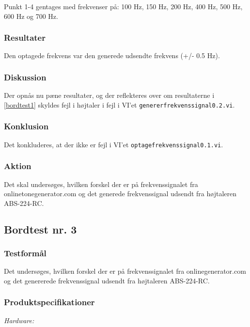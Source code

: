 			Punkt 1-4 gentages med frekvenser på: 100 Hz, 150 Hz, 200 Hz, 400 Hz, 500 Hz, 600 Hz og 700 Hz. 
			
			\subsubsection{Resultater}
			Den optagede frekvens var den generede udsendte frekvens (+/- 0.5 Hz). 
			\subsubsection{Diskussion}
			Der opnås nu pæne resultater, og der reflekteres over om resultaterne i \ref{bordtest1} skyldes fejl i højtaler i fejl i VI'et \texttt{genererfrekvenssignal0.2.vi}. 
			\subsubsection{Konklusion}
			Det konkluderes, at der ikke er fejl i VI'et \texttt{optagefrekvenssignal0.1.vi}. 
			\subsubsection{Aktion}
			Det skal undersøges, hvilken forskel der er på frekvenssignalet fra onlinetonegenerator.com og det generede frekvenssignal udsendt fra højtaleren ABS-224-RC.  
	
		\subsection{Bordtest nr. 3} %
		\subsubsection{Testformål}
		Det undersøges, hvilken forskel der er på frekvenssignalet fra onlinegenerator.com og det genererede frekvenssignal udsendt fra højtaleren ABS-224-RC.  
		
		\subsubsection{Produktspecifikationer}
		
		\textit{Hardware:}\\
		\\
		\\
		\pins\\
		\krympeflex
		\arduino\\
		\usbkabel\\
		\PC\\
		\mikrofon\\
	
